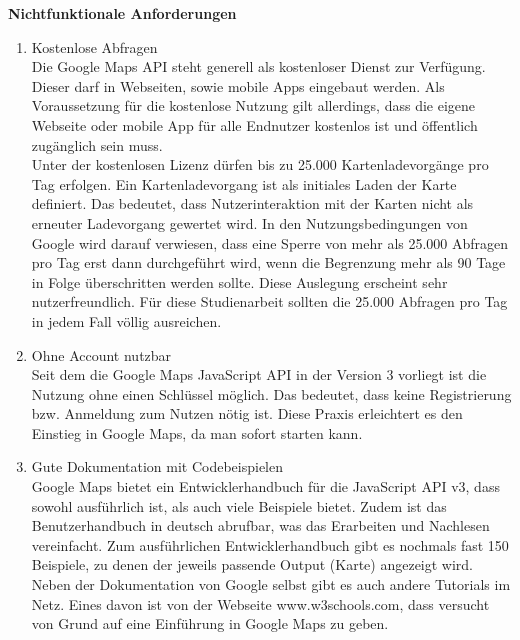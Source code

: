 \textbf{Nichtfunktionale Anforderungen}
\begin{enumerate}
\item Kostenlose Abfragen \\
Die Google Maps API steht generell als kostenloser Dienst zur Verfügung. Dieser darf in Webseiten, sowie mobile Apps eingebaut werden. Als Voraussetzung für die kostenlose Nutzung gilt allerdings, dass die eigene Webseite oder mobile App für alle Endnutzer kostenlos ist und öffentlich zugänglich sein muss.\\
Unter der kostenlosen Lizenz dürfen bis zu 25.000 Kartenladevorgänge pro Tag erfolgen. Ein Kartenladevorgang ist als initiales Laden der Karte definiert. Das bedeutet, dass Nutzerinteraktion mit der Karten nicht als erneuter Ladevorgang gewertet wird. 
In den Nutzungsbedingungen von Google wird darauf verwiesen, dass eine Sperre von mehr als 25.000 Abfragen pro Tag erst dann durchgeführt wird, wenn die Begrenzung mehr als 90 Tage in Folge überschritten werden sollte.
Diese Auslegung erscheint sehr nutzerfreundlich. Für diese Studienarbeit sollten die 25.000 Abfragen pro Tag in jedem Fall völlig ausreichen. \cite[Nutzungsbedingungen]{googlemaps}\cite[Lizenzierung]{googlemaps}


\item Ohne Account nutzbar\\
Seit dem die Google Maps JavaScript API in der Version 3 vorliegt ist die Nutzung ohne einen Schlüssel möglich. Das bedeutet, dass keine Registrierung bzw. Anmeldung zum Nutzen nötig ist. Diese Praxis erleichtert es den Einstieg in Google Maps, da man sofort starten kann. \cite{googlemapsblog}


\item Gute Dokumentation mit Codebeispielen\\
Google Maps bietet ein Entwicklerhandbuch für die JavaScript API v3, dass sowohl ausführlich ist, als auch viele Beispiele bietet. Zudem ist das Benutzerhandbuch in deutsch abrufbar, was das Erarbeiten und Nachlesen vereinfacht. 
Zum ausführlichen Entwicklerhandbuch gibt es nochmals fast 150 Beispiele, zu denen der jeweils passende Output (Karte) angezeigt wird.\cite[Documentation]{googlemaps} \\
Neben der Dokumentation von Google selbst gibt es auch andere Tutorials im Netz. Eines davon ist von der Webseite www.w3schools.com, dass versucht von Grund auf eine Einführung in Google Maps zu geben. 



\end{enumerate}



